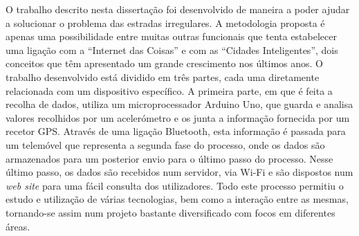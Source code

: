 O trabalho descrito nesta dissertação foi desenvolvido de maneira a poder ajudar a solucionar o problema das estradas irregulares.
A metodologia proposta é apenas uma possibilidade entre muitas outras funcionais que tenta estabelecer uma ligação com a ``Internet das Coisas'' e com as ``Cidades Inteligentes'', dois conceitos que têm apresentado um grande crescimento nos últimos anos.
O trabalho desenvolvido está dividido em três partes, cada uma diretamente relacionada com um dispositivo específico.
A primeira parte, em que é feita a recolha de dados, utiliza um microprocessador Arduino Uno, que guarda e analisa valores recolhidos por um acelerómetro e os junta a informação fornecida por um recetor GPS.
Através de uma ligação Bluetooth, esta informação é passada para um telemóvel que representa a segunda fase do processo, onde os dados são armazenados para um posterior envio para o último passo do processo.
Nesse último passo, os dados são recebidos num servidor, via Wi-Fi e são dispostos num \emph{web site} para uma fácil consulta dos utilizadores.
Todo este processo permitiu o estudo e utilização de várias tecnologias, bem como a interação entre as mesmas, tornando-se assim num projeto bastante diversificado com focos em diferentes áreas.